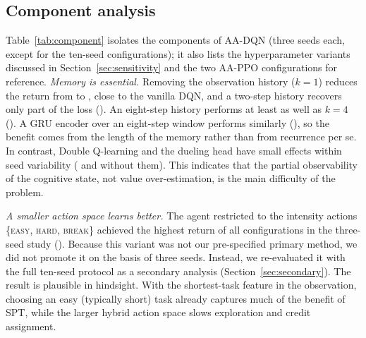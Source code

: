 \subsection{Component analysis}\label{sec:component}
Table~\ref{tab:component} isolates the components of AA-DQN (three seeds each, except for the ten-seed configurations); it also lists the hyperparameter variants discussed in Section~\ref{sec:sensitivity} and the two AA-PPO configurations for reference. \emph{Memory is essential.} Removing the observation history ($k=1$) reduces the return from \compAADQNRet{} to \compAADQNNoHistRet, close to the vanilla DQN, and a two-step history recovers only part of the loss (\compAADQNKTwoRet). An eight-step history performs at least as well as $k=4$ (\compAADQNKEightRet). A GRU encoder over an eight-step window performs similarly (\compAADQNGRURet), so the benefit comes from the length of the memory rather than from recurrence per se. In contrast, Double Q-learning and the dueling head have small effects within seed variability (\compAADQNNoDoubleRet{} and \compAADQNNoDuelingRet{} without them). This indicates that the partial observability of the cognitive state, not value over-estimation, is the main difficulty of the problem.

\emph{A smaller action space learns better.} The agent restricted to the intensity actions \{\textsc{easy}, \textsc{hard}, \textsc{break}\} achieved the highest return of all configurations in the three-seed study (\compAADQNThreeactRet). Because this variant was not our pre-specified primary method, we did not promote it on the basis of three seeds. Instead, we re-evaluated it with the full ten-seed protocol as a secondary analysis (Section~\ref{sec:secondary}). The result is plausible in hindsight. With the shortest-task feature in the observation, choosing an easy (typically short) task already captures much of the benefit of SPT, while the larger hybrid action space slows exploration and credit assignment.

\begin{table}[!htbp]
\centering
\caption{Component and sensitivity analysis (mean $\pm$ s.d.\ over seeds; 500 test days).}
\label{tab:component}
\small
\resizebox{\textwidth}{!}{}
\end{table}
